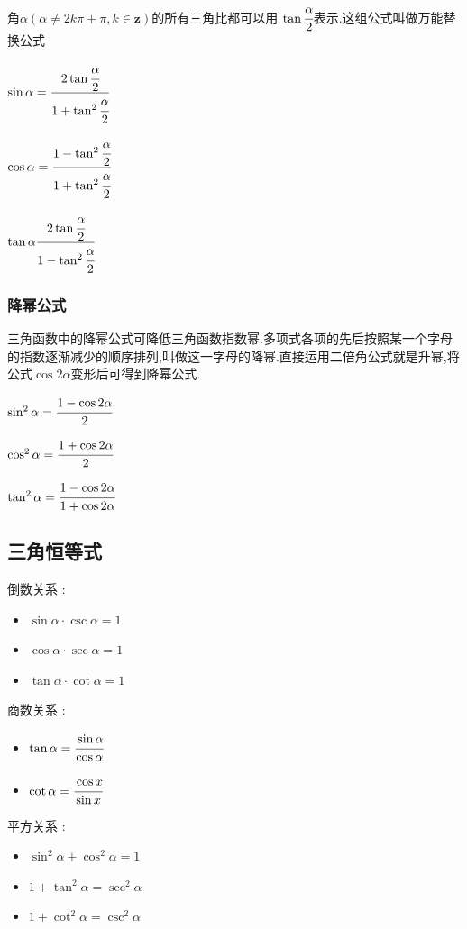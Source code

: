 \documentclass[UTF8,12pt]{ctexbook}
\begin{document}
{{{{    角$\alpha(\alpha \neq 2k\pi + \pi ,k \in \mathbf{z})$的所有三角比都可以用 $\tan\cfrac{\alpha}{2}$表示.这组公式叫做万能替换公式

    $\sin\alpha = \cfrac{2\tan\cfrac{\alpha}{2}}{1+\tan^2\cfrac{\alpha}{2}}$

    $\cos\alpha = \cfrac{1 - \tan^2\cfrac{\alpha}{2}}{1 + \tan^2\cfrac{\alpha}{2}}$

    $\tan\alpha \cfrac{2\tan\cfrac{\alpha}{2}}{1 - \tan^2\cfrac{\alpha}{2}}$
  }%

  \subsubsection{降幂公式}{
    三角函数中的降幂公式可降低三角函数指数幂.多项式各项的先后按照某一个字母的指数逐渐减少的顺序排列,叫做这一字母的降幂.直接运用二倍角公式就是升幂,将公式$\cos 2 \alpha$变形后可得到降幂公式.

    $\sin^2\alpha = \cfrac{1 - \cos2\alpha}{2}$

    $\cos^2\alpha = \cfrac{1 + \cos2\alpha}{2}$

    $\tan^2\alpha = \cfrac{1 - \cos2\alpha}{1 + \cos2\alpha}$
  }%

}%

\subsection{三角恒等式}{

  倒数关系 :
  \begin{itemize}
    \item $\sin\alpha \cdot \csc\alpha = 1$
    \item $\cos\alpha \cdot \sec\alpha = 1$
    \item $\tan\alpha \cdot \cot\alpha = 1$
  \end{itemize}

  商数关系 :
  \begin{itemize}
    \item $\tan\alpha = \cfrac{\sin\alpha}{\cos\alpha}$
    \item $\cot\alpha = \cfrac{\cos x}{\sin x}$
  \end{itemize}

  平方关系 :
  \begin{itemize}
    \item $\sin^2\alpha + \cos^2\alpha = 1$
    \item $1 + \tan^2\alpha = \sec^2\alpha$
    \item $1 + \cot^2\alpha = \csc^2\alpha$
  \end{itemize}

}}}
\end{document}
